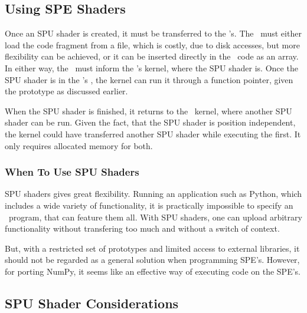 


\subsection{Using SPE Shaders}

Once an SPU shader is created, it must be transferred to
the \SPE{}'s. The \PPE\ must either load the code fragment from a
file, which is costly, due to disk accesses, but more flexibility can
be achieved, or it can be inserted directly in the \PPU\ code as an
array. In either way, the \PPE\ must inform the \SPE{}'s kernel, where
the SPU shader is. Once the SPU shader is in the \SPE{}'s \LS{}, the
kernel can run it through a function pointer, given the prototype as
discussed earlier.

When the SPU shader is finished, it returns to the \SPE\ kernel, where
another SPU shader can be run. Given the fact, that the SPU shader is
position independent, the kernel could have transferred another SPU
shader while executing the first. It only requires allocated memory
for both.

\subsubsection{When To Use SPU Shaders}

SPU shaders gives great flexibility. Running an application such as
Python, which includes a wide variety of functionality, it is
practically impossible to specify an \SPE\ program, that can feature
them all. With SPU shaders, one can upload arbitrary functionality
without transfering too much and without a switch of context.

But, with a restricted set of prototypes and limited access to
external libraries, it should not be regarded as a general solution
when programming SPE's. However, for porting NumPy, it seems like an effective
way of executing code on the SPE's.

\subsection{SPU Shader Considerations}

